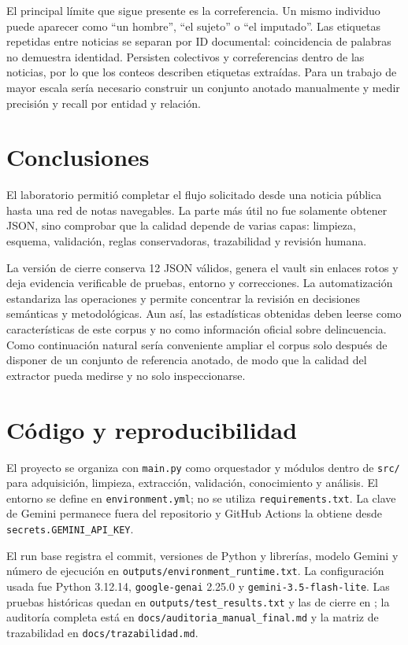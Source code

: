 \documentclass[conference]{IEEEtran}
\begin{document}
El principal límite que sigue presente es la correferencia. Un mismo individuo puede aparecer como ``un hombre'', ``el sujeto'' o ``el imputado''. Las etiquetas repetidas entre noticias se separan por ID documental: coincidencia de palabras no demuestra identidad. Persisten colectivos y correferencias dentro de las noticias, por lo que los conteos describen etiquetas extraídas. Para un trabajo de mayor escala sería necesario construir un conjunto anotado manualmente y medir precisión y recall por entidad y relación.

\section{Conclusiones}
El laboratorio permitió completar el flujo solicitado desde una noticia pública hasta una red de notas navegables. La parte más útil no fue solamente obtener JSON, sino comprobar que la calidad depende de varias capas: limpieza, esquema, validación, reglas conservadoras, trazabilidad y revisión humana.

La versión de cierre conserva 12 JSON válidos, genera el vault sin enlaces rotos y deja evidencia verificable de pruebas, entorno y correcciones. La automatización estandariza las operaciones y permite concentrar la revisión en decisiones semánticas y metodológicas. Aun así, las estadísticas obtenidas deben leerse como características de este corpus y no como información oficial sobre delincuencia. Como continuación natural sería conveniente ampliar el corpus solo después de disponer de un conjunto de referencia anotado, de modo que la calidad del extractor pueda medirse y no solo inspeccionarse.

\section{Código y reproducibilidad}
El proyecto se organiza con \texttt{main.py} como orquestador y módulos dentro de \texttt{src/} para adquisición, limpieza, extracción, validación, conocimiento y análisis. El entorno se define en \texttt{environment.yml}; no se utiliza \texttt{requirements.txt}. La clave de Gemini permanece fuera del repositorio y GitHub Actions la obtiene desde \texttt{secrets.GEMINI\_API\_KEY}.

El run base registra el commit, versiones de Python y librerías, modelo Gemini y número de ejecución en \texttt{outputs/environment\_runtime.txt}. La configuración usada fue Python 3.12.14, \texttt{google-genai} 2.25.0 y \texttt{gemini-3.5-flash-lite}. Las pruebas históricas quedan en \texttt{outputs/test\_results.txt} y las de cierre en ; la auditoría completa está en \texttt{docs/auditoria\_manual\_final.md} y la matriz de trazabilidad en \texttt{docs/trazabilidad.md}.
\end{document}
